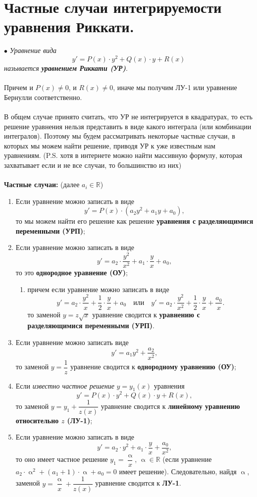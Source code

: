 \documentclass[a4paper, 12pt]{article}
\newcommand{\Rm}{\mathbb{R}}
\renewcommand{\alpha}{\upalpha}
\renewcommand{\alpha}{\upalpha}
\begin{document}
	\section*{Частные случаи интегрируемости уравнения Риккати.}
	$\bullet$ \textit{Уравнение вида $$y' = P(x)\cdot y^2 + Q(x)\cdot y + R(x)$$ называется \textbf{уравнением Риккати (УР)}}.\\\\
	Причем и $P(x)\ne 0$, и $R(x)\ne 0$, иначе мы получим ЛУ-1 или уравнение Бернулли соответственно.\\\\
	В общем случае принято считать, что УР не интегрируется в квадратурах, то есть решение уравнения нельзя представить в виде какого интеграла (или комбинации интегралов). Поэтому мы будем рассматривать некоторые частные случаи, в которых мы можем найти решение, приводя УР к уже известным нам уравнениям. (P.S. хотя в интернете можно найти массивную формулу, которая захватывает если и не все случаи, то большинство из них)\\\\
	\textbf{Частные случаи:} (далее $a_i \in \Rm$)
	\begin{enumerate}
		\item Если уравнение можно записать в виде $$y' = P(x)\cdot (a_2y^2 + a_1y + a_0),$$
		то мы можем найти его решение как решение \textbf{уравнения с разделяющимися переменными (УРП)};
		\item Если уравнение можно записать в виде $$y' = a_2\cdot \dfrac{y^2}{x^2} + a_1\cdot \dfrac{y}{x} +a_0,$$
		то это \textbf{однородное уравнение (ОУ)};
		\begin{enumerate}
			\item причем если уравнение можно записать в виде $$y' = a_2\cdot \dfrac{y^2}{x} + \dfrac{1}{2}\cdot \dfrac{y}{x} + a_0\quad \text{или}\quad y' = a_2\cdot \dfrac{y^2}{x^2} + \dfrac{1}{2}\cdot \dfrac{y}{x} + \dfrac{a_0}{x}. $$
			то заменой $y = z\sqrt x$ уравнение сводится к \textbf{уравнению с разделяющимися переменными (УРП)}.	
		\end{enumerate}
		\item Если уравнение можно записать виде $$y' = a_1y^2 + \dfrac{a_2}{x^2},$$
		то заменой $y = \dfrac{1}{z}$ уравнение сводится к \textbf{однородному уравнению (ОУ)};	
		\item Если \textit{известно частное решение} $ y =y_1(x)$ уравнения $$y' = P(x)\cdot y^2 + Q(x)\cdot y + R(x),$$
		то заменой $y = y_1 + \dfrac{1}{z(x)}$ уравнение сводится к \textbf{линейному уравнению относительно $z$ (ЛУ-1)}; 
		\item Если уравнение можно записать в виде $$y' = a_2\cdot y^2 + a_1\cdot \dfrac{y}{x} + \dfrac{a_0}{x^2},$$
		то оно имеет частное решение $y_1 = \dfrac{\alpha}{x}$, $\alpha\in \Rm$ (если уравнение $a_2\cdot \alpha ^2+ (a_1 + 1)\cdot \alpha + a_0 = 0$ имеет решение). Следовательно, найдя $\alpha$, заменой $y = \dfrac{\alpha}{x} + \dfrac{1}{z(x)}$ уравнение сводится к \textbf{ЛУ-1}.
	\end{enumerate}
\end{document}
